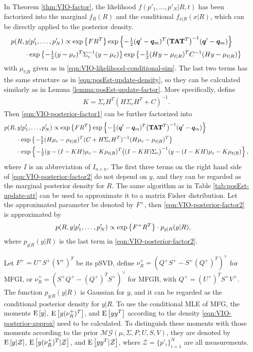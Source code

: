 In Theorem \ref{thm:VIO-factor}, the likelihood $f(p'_1,\ldots,p'_N|R,t)$ has been factorized into the marginal $f_R(R)$ and the conditional $f_{x|R}(x|R)$, which can be directly applied to the posterior density.
\begin{align} \label{eqn:VIO-posterior-factor1}
	&p(R,y|p'_1,\ldots,p'_N) \propto \exp\left\{ FR^T \right\} \exp\left\{ -\tfrac{1}{2}(\bm{q}'-\bm{q}_m)^T \big(\mathbf{T}\mathbf{A}\mathbf{T}^T\big)^{-1} (\bm{q}'-\bm{q}_m) \right\} \nonumber \\
	&\qquad \cdot \exp\left\{ -\tfrac{1}{2}(y-\mu_c)^T \Sigma_c^{-1} (y-\mu_c) \right\} \exp\left\{ -\tfrac{1}{2}(Hy - \mu_{t|R})^T C^{-1} (Hy - \mu_{t|R}) \right\}
\end{align}
with $\mu_{t|R}$ given as in \eqref{eqn:VIO-likelihood-conditional-sim}.
The last two terms has the same structure as in \eqref{eqn:posEst-update-density}, so they can be calculated similarly as in Lemma \ref{lemma:posEst-update-factor}.
More specifically, define
\begin{align}
	K = \Sigma_cH^T(H\Sigma_cH^T + C)^{-1}.
\end{align}
Then \eqref{eqn:VIO-posterior-factor1} can be further factorized into
\begin{align} \label{eqn:VIO-posterior-factor2}
	&p(R,y|p'_1,\ldots,p'_N) \propto \exp\left\{ FR^T \right\} \exp\left\{ -\tfrac{1}{2}(\bm{q}'-\bm{q}_m)^T \big(\mathbf{T}\mathbf{A}\mathbf{T}^T\big)^{-1} (\bm{q}'-\bm{q}_m) \right\} \nonumber \\
	&\qquad \cdot \exp\left\{ -\tfrac{1}{2} (H\mu_c-\mu_{t|R})^T (C + H\Sigma_cH^T)^{-1} (H\mu_c-\mu_{t|R})^T \right\} \nonumber \\
	&\qquad \cdot \exp\left\{ -\tfrac{1}{2} (y-(I-KH)\mu_c-K\mu_{t|R})^T \big((I-KH)\Sigma_c\big)^{-1} (y-(I-KH)\mu_c-K\mu_{t|R}) \right\},
\end{align}
where $I$ is an abbreviation of $I_{n\times n}$.
The first three terms on the right hand side of \eqref{eqn:VIO-posterior-factor2} do not depend on $y$, and they can be regarded as the marginal posterior density for $R$.
The same algorithm as in Table \ref{tab:posEst-update-att} can be used to approximate it to a matrix Fisher distribution.
Let the approximated parameter be denoted by $F^+$, then \eqref{eqn:VIO-posterior-factor2} is approximated by
\begin{align} \label{eqn:VIO-posterior-approx}
	&p(R,y|p'_1,\ldots,p'_N) \propto \exp\left\{ F^+R^T \right\} \cdot p_{y|R}(y|R),
\end{align}
where $p_{y|R}(y|R)$ is the last term in \eqref{eqn:VIO-posterior-factor2}.

Let $F^+ = U^+S^+(V^+)^T$ be its pSVD, define $\nu_R^+ = (Q^+S^+ - S^+(Q^+)^T)^\vee$ for MFGI, or $\nu_R^+ = (S^+Q^+ - (Q^+)^TS^+)^\vee$ for MFGB, with $Q^+ = (U^+)^TS^+V^+$.
The function $p_{y|R}(y|R)$ is Gaussian for $y$, and it can be regarded as the conditional posterior density for $y|R$.
To use the conditional MLE of MFG, the moments $\mathrm{E}\left[ y \right]$, $\mathrm{E}\left[ y(\nu_R^+)^T \right]$, and $\mathrm{E}\left[ yy^T \right]$ according to the density \eqref{eqn:VIO-posterior-approx} need to be calculated.
To distinguish these moments with those moments according to the prior $\mathcal{MG}(\mu,\Sigma,P,U,S,V)$, they are denoted by $\mathrm{E}\left[ y|\mathcal{Z} \right]$, $\mathrm{E}\left[ y(\nu_R^+)^T|\mathcal{Z} \right]$, and $\mathrm{E}\left[ yy^T|\mathcal{Z} \right]$, where $\mathcal{Z} = \{p'_i\}_{i=1}^N$ are all measurements.

